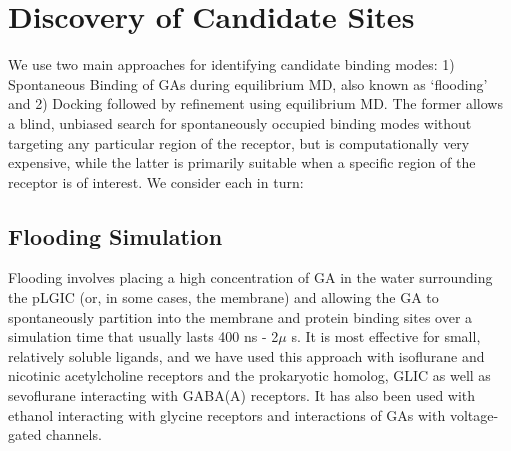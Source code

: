 \documentclass[12pt]{article}
\begin{document}
\section{Discovery of Candidate Sites}
We use two main approaches for identifying candidate binding modes: 1) Spontaneous Binding of GAs during equilibrium MD, also known as `flooding' and 2) Docking followed by refinement using equilibrium MD.  The former allows a blind, unbiased search for spontaneously occupied binding modes without targeting any particular region of the receptor, but is computationally very expensive, while the latter is primarily suitable when a specific region of the receptor is of interest.  We consider each in turn: 

\subsection{Flooding Simulation}
Flooding involves placing a high concentration of GA in the water surrounding the pLGIC (or, in some cases, the membrane) and allowing the GA to spontaneously partition into the membrane and protein binding sites over a simulation time that usually lasts 400 ns - 2$\mu$ s. It is most effective for small, relatively soluble ligands, and we have used this approach with isoflurane and nicotinic acetylcholine receptors and the prokaryotic homolog, GLIC\cite{Brannigan2010a} as well as sevoflurane interacting with GABA(A) receptors\cite{Murlidaran2017}.  It has also been used with ethanol interacting with glycine receptors\cite{Murail2011} and interactions of GAs with voltage-gated channels\cite{Raju2013}.
\end{document}
